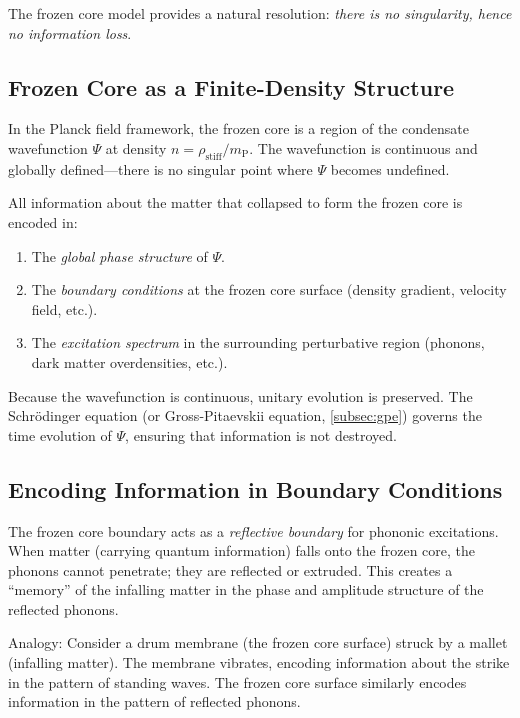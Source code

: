 \documentclass[12pt,a4paper]{article}
\newcommand{\planckmass}{m_\text{P}}
\newcommand{\planckfield}{\Psi}
\newcommand{\rhostiff}{\rho_\text{stiff}}
\theoremstyle{definition}
\begin{document}
The frozen core model provides a natural resolution: \emph{there is no singularity, hence no information loss}.

\subsection{Frozen Core as a Finite-Density Structure}
\label{subsec:finite_density_structure}

In the Planck field framework, the frozen core is a region of the condensate wavefunction $\planckfield$ at density $n = \rhostiff/\planckmass$. The wavefunction is continuous and globally defined—there is no singular point where $\planckfield$ becomes undefined.

All information about the matter that collapsed to form the frozen core is encoded in:
\begin{enumerate}
  \item The \emph{global phase structure} of $\planckfield$.
  \item The \emph{boundary conditions} at the frozen core surface (density gradient, velocity field, etc.).
  \item The \emph{excitation spectrum} in the surrounding perturbative region (phonons, dark matter overdensities, etc.).
\end{enumerate}

Because the wavefunction is continuous, unitary evolution is preserved. The Schrödinger equation (or Gross-Pitaevskii equation, \cref{subsec:gpe}) governs the time evolution of $\planckfield$, ensuring that information is not destroyed.

\subsection{Encoding Information in Boundary Conditions}
\label{subsec:boundary_conditions}

The frozen core boundary acts as a \emph{reflective boundary} for phononic excitations. When matter (carrying quantum information) falls onto the frozen core, the phonons cannot penetrate; they are reflected or extruded. This creates a ``memory'' of the infalling matter in the phase and amplitude structure of the reflected phonons.

Analogy: Consider a drum membrane (the frozen core surface) struck by a mallet (infalling matter). The membrane vibrates, encoding information about the strike in the pattern of standing waves. The frozen core surface similarly encodes information in the pattern of reflected phonons.
\end{document}
